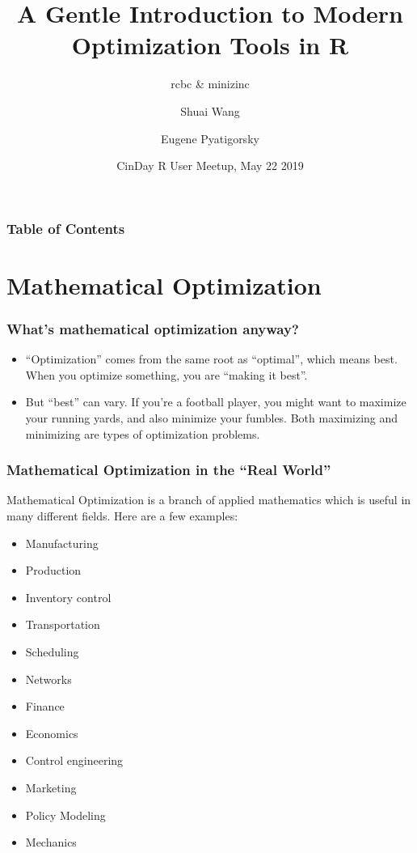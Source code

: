 \documentclass[xcolor=dvipsnames,aspectratio=169]{beamer}
\title[]{A Gentle Introduction to Modern Optimization Tools in R}
\subtitle{rcbc \& minizinc 
}
\author[]{Shuai Wang \and Eugene Pyatigorsky}
\institute[] %
{84.51 Operations Research}
\date[] %
{CinDay R User Meetup, May 22 2019}
\begin{document}
\frame{\titlepage}


\begin{frame}
\frametitle{Table of Contents}
\tableofcontents
\end{frame}


\section{Mathematical Optimization}

\begin{frame}
\frametitle{What's mathematical optimization anyway?}

\begin{itemize}
    \item “Optimization” comes from the same root as “optimal”, which means best. When you
optimize something, you are “making it best”.
 
 
\item But “best” can vary. If you’re a football player, you might want to maximize your
running yards, and also minimize your fumbles. Both maximizing and minimizing are types
of optimization problems.
\end{itemize}



\end{frame}



\begin{frame}
\frametitle{Mathematical Optimization in the “Real World”}
Mathematical Optimization is a branch of applied mathematics which is useful in many different fields. Here are a few examples:
 \begin{multicols}{2}
    \begin{itemize}
        \item Manufacturing
        \item Production
        \item Inventory control
        \item Transportation
        \item Scheduling
        \item Networks
        \item Finance
        \item Economics
        \item Control engineering
        \item Marketing
        \item Policy Modeling
        \item Mechanics
    \end{itemize}
    \end{multicols}

\end{frame}
\end{document}
